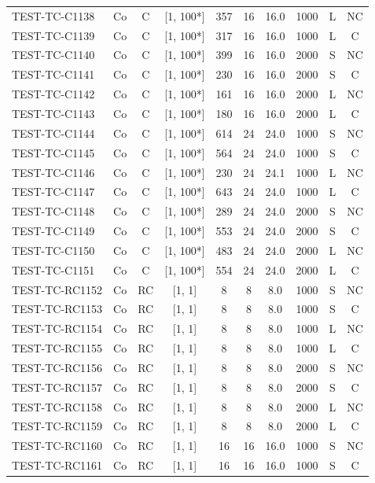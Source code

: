 \begin{longtable}{lccccccccc}
TEST-TC-C1138 & Co & C & [1, 100*] & 357 & 16 & 16.0 & 1000 & L & NC \\
TEST-TC-C1139 & Co & C & [1, 100*] & 317 & 16 & 16.0 & 1000 & L & C \\
TEST-TC-C1140 & Co & C & [1, 100*] & 399 & 16 & 16.0 & 2000 & S & NC \\
TEST-TC-C1141 & Co & C & [1, 100*] & 230 & 16 & 16.0 & 2000 & S & C \\
TEST-TC-C1142 & Co & C & [1, 100*] & 161 & 16 & 16.0 & 2000 & L & NC \\
TEST-TC-C1143 & Co & C & [1, 100*] & 180 & 16 & 16.0 & 2000 & L & C \\
TEST-TC-C1144 & Co & C & [1, 100*] & 614 & 24 & 24.0 & 1000 & S & NC \\
TEST-TC-C1145 & Co & C & [1, 100*] & 564 & 24 & 24.0 & 1000 & S & C \\
TEST-TC-C1146 & Co & C & [1, 100*] & 230 & 24 & 24.1 & 1000 & L & NC \\
TEST-TC-C1147 & Co & C & [1, 100*] & 643 & 24 & 24.0 & 1000 & L & C \\
TEST-TC-C1148 & Co & C & [1, 100*] & 289 & 24 & 24.0 & 2000 & S & NC \\
TEST-TC-C1149 & Co & C & [1, 100*] & 553 & 24 & 24.0 & 2000 & S & C \\
TEST-TC-C1150 & Co & C & [1, 100*] & 483 & 24 & 24.0 & 2000 & L & NC \\
TEST-TC-C1151 & Co & C & [1, 100*] & 554 & 24 & 24.0 & 2000 & L & C \\
TEST-TC-RC1152 & Co & RC & [1, 1] & 8 & 8 & 8.0 & 1000 & S & NC \\
TEST-TC-RC1153 & Co & RC & [1, 1] & 8 & 8 & 8.0 & 1000 & S & C \\
TEST-TC-RC1154 & Co & RC & [1, 1] & 8 & 8 & 8.0 & 1000 & L & NC \\
TEST-TC-RC1155 & Co & RC & [1, 1] & 8 & 8 & 8.0 & 1000 & L & C \\
TEST-TC-RC1156 & Co & RC & [1, 1] & 8 & 8 & 8.0 & 2000 & S & NC \\
TEST-TC-RC1157 & Co & RC & [1, 1] & 8 & 8 & 8.0 & 2000 & S & C \\
TEST-TC-RC1158 & Co & RC & [1, 1] & 8 & 8 & 8.0 & 2000 & L & NC \\
TEST-TC-RC1159 & Co & RC & [1, 1] & 8 & 8 & 8.0 & 2000 & L & C \\
TEST-TC-RC1160 & Co & RC & [1, 1] & 16 & 16 & 16.0 & 1000 & S & NC \\
TEST-TC-RC1161 & Co & RC & [1, 1] & 16 & 16 & 16.0 & 1000 & S & C \\

\end{longtable}
